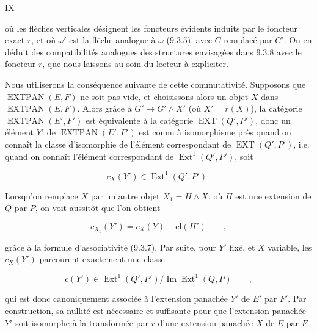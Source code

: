 \hfill IX

où les flèches verticales désignent les foncteurs évidents induits par le foncteur exact $r$, et où $\omega'$ est la flèche analogue à $\omega$ (9.3.5), avec $C$ remplacé par $C'$. On en déduit des compatibilités analogues des structures envisagées dans 9.3.8 avec le foncteur $r$, que nous laissons au soin du lecteur à expliciter.

Nous utiliserons la conséquence suivante de cette commutativité. Supposons que $\operatorname{EXTPAN}(E,F)$ ne soit pas vide, et choisissons alors un objet $X$ dans $\operatorname{EXTPAN}(E,F)$. Alors grâce à $G'\longmapsto G'\wedge X'$ (où $X'=r(X)$), la catégorie $\operatorname{EXTPAN}(E',F')$ est équivalente à la catégorie $\operatorname{EXT}(Q',P')$, donc un élément $Y'$ de $\operatorname{EXTPAN}(E',F')$ est connu à isomorphisme près quand on connaît la classe d'isomorphie de l'élément correspondant de $\operatorname{EXT}(Q',P')$, i.e. quand on connaît l'élément correspondant de $\operatorname{Ext}^1(Q',P')$, soit

\[
c_X(Y')\in\operatorname{Ext}^1(Q',P')\,.
\]

Lorsqu'on remplace $X$ par un autre objet $X_1=H\wedge X$, où $H$ est une extension de $Q$ par $P$, on voit aussitôt que l'on obtient

\[
c_{X_1}(Y')=c_X(Y)-\mathrm{cl}(H')\qquad,
\]

grâce à la formule d'associativité (9.3.7). Par suite, pour $Y'$ fixé, et $X$ variable, les $c_X(Y')$ parcourent exactement une classe

\[
c(Y')\in\operatorname{Ext}^1(Q',P')/\operatorname{Im}\operatorname{Ext}^1(Q,P)\qquad,\tag*{(9.3.13)}
\]

qui est donc canoniquement associée à l'extension panachée $Y'$ de $E'$ par $F'$. Par construction, sa nullité est nécessaire et suffisante pour que l'extension panachée $Y'$ soit isomorphe à la transformée par $r$ d'une extension panachée $X$ de $E$ par $F$.

